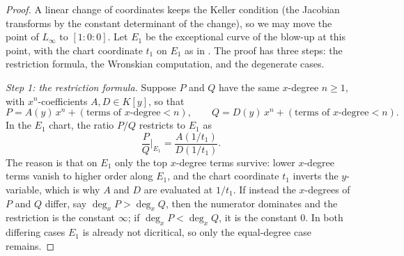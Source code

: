 \documentclass[a4paper,11pt]{article}
\newcommand{\filename}[1]{\texttt{\seqsplit{#1}}}
\theoremstyle{plain}
\theoremstyle{definition}
\theoremstyle{remark}
\begin{document}
\begin{proof}
A linear change of coordinates keeps the Keller condition (the Jacobian transforms by the
constant determinant of the change), so we may move the point of $L_\infty$ to
$[1 : 0 : 0]$. Let $E_1$ be the exceptional curve of the blow-up at this point, with the
chart coordinate $t_1$ on $E_1$ as in \filename{lean/check\_e1\_index.py}. The proof has three
steps: the restriction formula, the Wronskian computation, and the degenerate cases.

\emph{Step 1: the restriction formula.} Suppose $P$ and $Q$ have the same $x$-degree
$n \geq 1$, with $x^n$-coefficients $A, D \in K[y]$, so that
\begin{equation}\label{eq:lead-expansion}
P = A(y)\, x^n + (\text{terms of $x$-degree} < n), \qquad
Q = D(y)\, x^n + (\text{terms of $x$-degree} < n).
\end{equation}
In the $E_1$ chart, the ratio $P/Q$ restricts to $E_1$ as
\begin{equation}\label{eq:e1-restriction}
\frac{P}{Q}\bigg|_{E_1} = \frac{A(1/t_1)}{D(1/t_1)}.
\end{equation}
The reason is that on $E_1$ only the top $x$-degree terms survive: lower $x$-degree terms
vanish to higher order along $E_1$, and the chart coordinate $t_1$ inverts the $y$-variable,
which is why $A$ and $D$ are evaluated at $1/t_1$. If instead the $x$-degrees of $P$ and $Q$
differ, say $\deg_x P > \deg_x Q$, then the numerator dominates and the restriction is the
constant $\infty$; if $\deg_x P < \deg_x Q$, it is the constant $0$. In both differing cases
$E_1$ is already not dicritical, so only the equal-degree case remains.


\end{proof}
\end{document}

